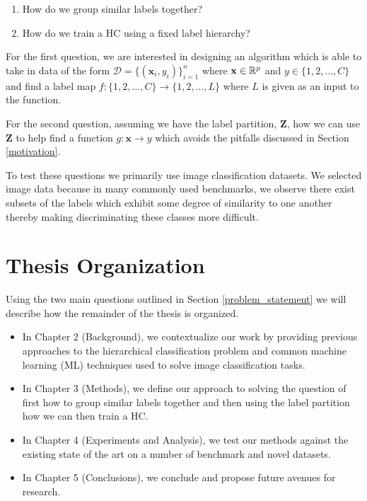 \documentclass[draft, ../thesis.tex]{subfiles}
\begin{document}
    \begin{enumerate}
    	\item How do we group similar labels together?
    	\item How do we train a HC using a fixed label hierarchy?
    \end{enumerate}

    For the first question, we are interested in designing an algorithm which is
    able to take in data of the form $\mathcal{D} = \{(\mathbf{x}_i,
    y_i)\}_{i=1}^n$ where $\mathbf{x} \in \mathbb{R}^p$ and $y \in \{1, 2, \ldots, C\}$
    and find a label map $f: \{1, 2, \ldots, C\} \longrightarrow \{1, 2, \ldots,
    L\}$ where $L$ is given as an input to the function.

    For the second question, assuming we have the label partition, $\mathbf{Z}$,
    how we can use $\mathbf{Z}$ to help find a function $g: \mathbf{x}
    \longrightarrow y$ which avoids the pitfalls discussed in Section
    \ref{motivation}.

    To test these questions we primarily use image classification datasets. We
    selected image data because in many commonly used benchmarks, we observe
    there exist subsets of the labels which exhibit some degree of similarity to
    one another thereby making discriminating these classes more difficult.

    \section{Thesis Organization}
    Using the two main questions outlined in Section \ref{problem_statement} we
    will describe how the remainder of the thesis is organized.

    \begin{itemize}
    	\item In Chapter 2 (Background), we contextualize our work by providing
    	previous approaches to the hierarchical classification problem and common
    	machine learning (ML) techniques used to solve image classification tasks.

    	\item In Chapter 3 (Methods), we define our approach to solving the
    	question of first how to group similar labels together and then using the
    	label partition how we can then train a HC.

    	\item In Chapter 4 (Experiments and Analysis), we test our methods against
    	the existing state of the art on a number of benchmark and novel datasets.

    	\item In Chapter 5 (Conclusions), we conclude and propose future avenues
      for research.
      
    \end{itemize}
\end{document}
